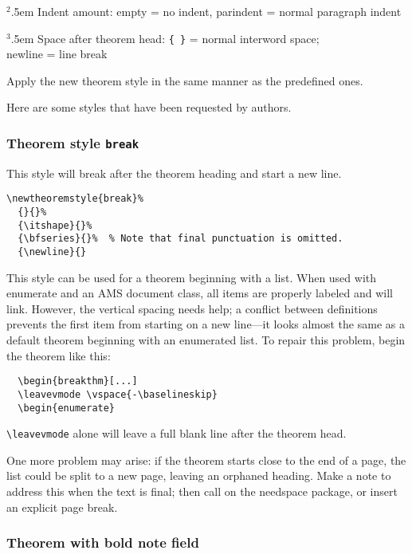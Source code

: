 \documentclass[11pt,twoside]{article}
\newcommand{\ntt}{%
  \fontfamily\ttdefault \fontseries\mddefault \fontshape\updefault
  \selectfont
}
\DeclareRobustCommand{\cn}[1]{{\ntt\bslchar#1}}
\DeclareRobustCommand{\pkg}[1]{{\ntt#1}}
\DeclareRobustCommand{\env}[1]{{\ntt#1}}
\def\ntnote#1{{\normalfont$^{#1}$}\hangindent.5em}
\begin{document}
\noindent
\ntnote2 Indent amount: empty = no indent, \cn{parindent} = normal
 paragraph indent

\noindent
\ntnote3 Space after theorem head: \verb+{ }+ = normal interword space; \\
 \cn{newline} = line break

\smallskip
Apply the new theorem style in the same manner as the predefined ones.

Here are some styles that have been requested by authors.

\subsubsection{Theorem style \texttt{break}}
\label{thmstyle:break}
This style will break after the theorem heading and start a new line.
\begin{verbatim}
\newtheoremstyle{break}%
  {}{}%
  {\itshape}{}%
  {\bfseries}{}%  % Note that final punctuation is omitted.
  {\newline}{}
\end{verbatim}

This style can be used for a theorem beginning with a list.
When used with \env{enumerate} and an AMS document class, all items
are properly labeled and will link.  However, the vertical spacing
needs help; a conflict between definitions prevents the first
item from starting on a new line---it looks almost the same as
a default theorem beginning with an enumerated list.
To repair this problem, begin the theorem like this:
\begin{verbatim}
  \begin{breakthm}[...]
  \leavevmode \vspace{-\baselineskip}
  \begin{enumerate}
\end{verbatim}
\verb+\leavevmode+ alone will leave a full blank line after the theorem head.

One more problem may arise: if the theorem starts close to the end
of a page, the list could be split to a new page, leaving an
orphaned heading.  Make a note to address this when the text is
final; then call on the \pkg{needspace} \cite{NDS} package, or insert
an explicit page break.

\subsubsection{Theorem with bold note field}
\end{document}
